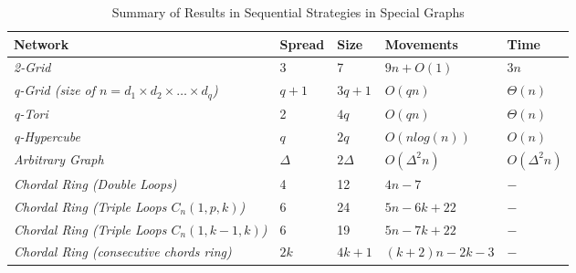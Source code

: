 \begin{table} [hbtp]
\caption{Summary of Results in Sequential Strategies in Special Graphs}
\label{table:Summary of Results in Sequential Strategies in Special Graphs}
\centering
\tabulinesep=2mm
\begin{tabu} to 140 mm {|X[6,c]|X[4,l]|X[4,l]|X[4,l]|X[4,l]|} \hline 
Network  &   Spread &   Size   &   Movements &   Time \\ \hline
{\em 2-Grid}   &3 &7 & $9n+O(1)$   & $3n$         \\ \hline
{\em q-Grid (size of $n=d_1\times d_2 \times\ldots\times d_q$)} & $q+1$    & $3q+1$  & $O(qn)$      & $\Theta (n)$            \\ \hline

{\em q-Tori} & 2   & $4q$          & $O(qn)$     & $\Theta(n) $    \\ \hline
{\em q-Hypercube} & $q$ & $2q$    & $O(nlog(n))$     & $O(n)$    \\ \hline

{\em Arbitrary Graph} & $\Delta$    & $2\Delta $     & $O(\Delta^2n)$     & $O(\Delta^2n)$    \\ \hline
{\em Chordal Ring (Double Loops)} & 4   & 12         & $4n-7$     & $-$    \\ \hline
{\em Chordal Ring (Triple Loops $C_n(1,p,k)$)} & 6 & 24          & $5n-6k+22$     & $-$   \\ \hline
{\em Chordal Ring (Triple Loops $C_n(1,k-1,k)$)} & 6  & 19       & $5n-7k+22$     & $-$   \\ \hline
{\em Chordal Ring (consecutive chords ring)} & $2k$   & $4k+1$          & $(k+2)n-2k-3$     & $-$   \\ \hline
\end{tabu}
\end{table}


 









